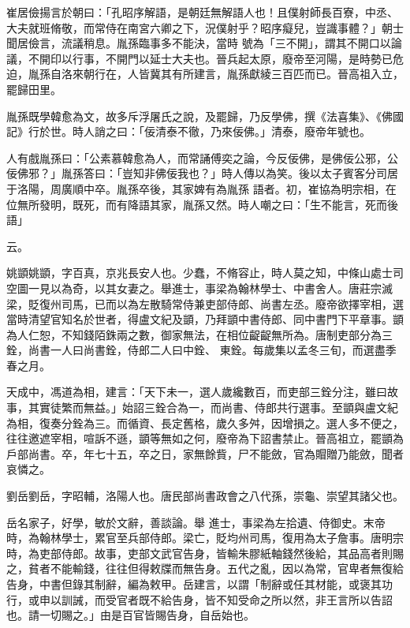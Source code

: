 \begin{pinyinscope}
 崔居儉揚言於朝曰：「孔昭序解語，是朝廷無解語人也！且僕射師長百寮，中丞、大夫就班脩敬，而常侍在南宮六卿之下，況僕射乎？昭序癡兒，豈識事體？」朝士聞居儉言，流議稍息。胤孫臨事多不能決，當時
 號為「三不開」，謂其不開口以論議，不開印以行事，不開門以延士大夫也。晉兵起太原，廢帝至河陽，是時勢已危迫，胤孫自洛來朝行在，人皆冀其有所建言，胤孫獻綾三百匹而已。晉高祖入立，罷歸田里。



 胤孫既學韓愈為文，故多斥浮屠氏之說，及罷歸，乃反學佛，撰《法喜集》、《佛國記》行於世。時人誚之曰：「佞清泰不徹，乃來佞佛。」清泰，廢帝年號也。



 人有戲胤孫曰：「公素慕韓愈為人，而常誦傅奕之論，今反佞佛，是佛佞公邪，公佞佛邪？」胤孫答曰：「豈知非佛佞我也？」時人傳以為笑。後以太子賓客分司居于洛陽，周廣順中卒。胤孫卒後，其家婢有為胤孫
 語者。初，崔協為明宗相，在位無所發明，既死，而有降語其家，胤孫又然。時人嘲之曰：「生不能言，死而後語」



 云。



 姚顗姚顗，字百真，京兆長安人也。少蠢，不脩容止，時人莫之知，中條山處士司空圖一見以為奇，以其女妻之。舉進士，事梁為翰林學士、中書舍人。唐莊宗滅梁，貶復州司馬，已而以為左散騎常侍兼吏部侍郎、尚書左丞。廢帝欲擇宰相，選當時清望官知名於世者，得盧文紀及顗，乃拜顗中書侍郎、同中書門下平章事。顗為人仁恕，不知錢陌銖兩之數，御家無法，在相位齪齪無所為。唐制吏部分為三銓，尚書一人曰尚書銓，侍郎二人曰中銓、
 東銓。每歲集以孟冬三旬，而選盡季春之月。



 天成中，馮道為相，建言：「天下未一，選人歲纔數百，而吏部三銓分注，雖曰故事，其實徒繁而無益。」始詔三銓合為一，而尚書、侍郎共行選事。至顗與盧文紀為相，復奏分銓為三。而循資、長定舊格，歲久多舛，因增損之。選人多不便之，往往邀遮宰相，喧訴不遜，顗等無如之何，廢帝為下詔書禁止。晉高祖立，罷顗為戶部尚書。卒，年七十五，卒之日，家無餘貲，尸不能斂，官為賵贈乃能斂，聞者哀憐之。



 劉岳劉岳，字昭輔，洛陽人也。唐民部尚書政會之八代孫，崇龜、崇望其諸父也。



 岳名家子，好學，敏於文辭，善談論。舉
 進士，事梁為左拾遺、侍御史。末帝時，為翰林學士，累官至兵部侍郎。梁亡，貶均州司馬，復用為太子詹事。唐明宗時，為吏部侍郎。故事，吏部文武官告身，皆輸朱膠紙軸錢然後給，其品高者則賜之，貧者不能輸錢，往往但得敕牒而無告身。五代之亂，因以為常，官卑者無復給告身，中書但錄其制辭，編為敕甲。岳建言，以謂「制辭或任其材能，或褒其功行，或申以訓誡，而受官者既不給告身，皆不知受命之所以然，非王言所以告詔也。請一切賜之。」由是百官皆賜告身，自岳始也。




\end{pinyinscope}
